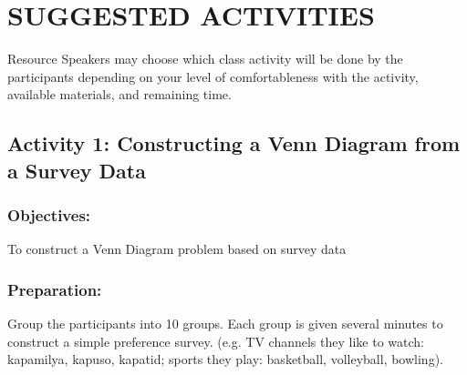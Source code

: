 \section*{SUGGESTED ACTIVITIES}
Resource Speakers may choose which class activity will be done by the participants depending on
your level of comfortableness with the activity, available materials, and remaining time.
\subsection*{Activity 1: Constructing a Venn Diagram from a Survey Data}
\subsubsection*{Objectives:}
To construct a Venn Diagram problem based on survey data
\subsubsection*{Preparation:}
Group the participants into 10 groups. Each group is given several minutes to construct a
simple preference survey. (e.g. TV channels they like to watch: kapamilya, kapuso, kapatid;
sports they play: basketball, volleyball, bowling).
